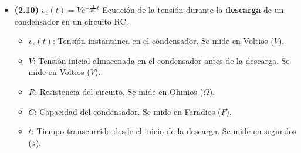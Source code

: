 \documentclass{article}
\begin{document}
\begin{itemize}
				\item \textbf{(2.10)} $\boxed{v_c(t)=Ve^{-\frac{1}{RC}t}}$ Ecuación de la tensión durante la \textbf{descarga} de un condensador en un circuito RC.
					\begin{itemize}
						\item $v_c(t)$: Tensión instantánea en el condensador. Se mide en Voltios ($V$).
						\item $V$: Tensión inicial almacenada en el condensador antes de la descarga. Se mide en Voltios ($V$).
						\item $R$: Resistencia del circuito. Se mide en Ohmios ($\Omega$).
						\item $C$: Capacidad del condensador. Se mide en Faradios ($F$).
						\item $t$: Tiempo transcurrido desde el inicio de la descarga. Se mide en segundos ($s$).
					\end{itemize}
			\end{itemize}
\end{document}
